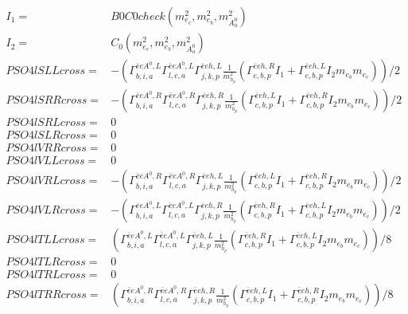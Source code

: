 \documentclass[A4,landscape]{article}
\begin{document}
\begin{align} 
I_1= & B0C0check(m^2_{e_{{c}}}, m^2_{e_{{b}}}, m^2_{A^0_{{a}}}) \\ 
I_2= & C_0(m^2_{e_{{c}}}, m^2_{e_{{b}}}, m^2_{A^0_{{a}}}) \\ 
  PSO4lSLLcross= & -( \Gamma^{\bar{e}e A^0 ,L}_{b, i, a} \Gamma^{\bar{e}e A^0 ,L}_{l, c, a} \Gamma^{\bar{e}e h ,L}_{j, k, p} \frac{1}{m^2_{h_{{p}}}} (\Gamma^{\bar{e}e h ,R}_{c, b, p} I_1 + \Gamma^{\bar{e}e h ,L}_{c, b, p} I_2 m_{e_{{b}}} m_{e_{{c}}}))/2 \\ 
  PSO4lSRRcross= & -( \Gamma^{\bar{e}e A^0 ,R}_{b, i, a} \Gamma^{\bar{e}e A^0 ,R}_{l, c, a} \Gamma^{\bar{e}e h ,R}_{j, k, p} \frac{1}{m^2_{h_{{p}}}} (\Gamma^{\bar{e}e h ,L}_{c, b, p} I_1 + \Gamma^{\bar{e}e h ,R}_{c, b, p} I_2 m_{e_{{b}}} m_{e_{{c}}}))/2 \\ 
  PSO4lSRLcross= & 0 \\ 
  PSO4lSLRcross= & 0 \\ 
  PSO4lVRRcross= & 0 \\ 
  PSO4lVLLcross= & 0 \\ 
  PSO4lVRLcross= & -( \Gamma^{\bar{e}e A^0 ,R}_{b, i, a} \Gamma^{\bar{e}e A^0 ,R}_{l, c, a} \Gamma^{\bar{e}e h ,L}_{j, k, p} \frac{1}{m^2_{h_{{p}}}} (\Gamma^{\bar{e}e h ,L}_{c, b, p} I_1 + \Gamma^{\bar{e}e h ,R}_{c, b, p} I_2 m_{e_{{b}}} m_{e_{{c}}}))/2 \\ 
  PSO4lVLRcross= & -( \Gamma^{\bar{e}e A^0 ,L}_{b, i, a} \Gamma^{\bar{e}e A^0 ,L}_{l, c, a} \Gamma^{\bar{e}e h ,R}_{j, k, p} \frac{1}{m^2_{h_{{p}}}} (\Gamma^{\bar{e}e h ,R}_{c, b, p} I_1 + \Gamma^{\bar{e}e h ,L}_{c, b, p} I_2 m_{e_{{b}}} m_{e_{{c}}}))/2 \\ 
  PSO4lTLLcross= & ( \Gamma^{\bar{e}e A^0 ,L}_{b, i, a} \Gamma^{\bar{e}e A^0 ,L}_{l, c, a} \Gamma^{\bar{e}e h ,L}_{j, k, p} \frac{1}{m^2_{h_{{p}}}} (\Gamma^{\bar{e}e h ,R}_{c, b, p} I_1 + \Gamma^{\bar{e}e h ,L}_{c, b, p} I_2 m_{e_{{b}}} m_{e_{{c}}}))/8 \\ 
  PSO4lTLRcross= & 0 \\ 
  PSO4lTRLcross= & 0 \\ 
  PSO4lTRRcross= & ( \Gamma^{\bar{e}e A^0 ,R}_{b, i, a} \Gamma^{\bar{e}e A^0 ,R}_{l, c, a} \Gamma^{\bar{e}e h ,R}_{j, k, p} \frac{1}{m^2_{h_{{p}}}} (\Gamma^{\bar{e}e h ,L}_{c, b, p} I_1 + \Gamma^{\bar{e}e h ,R}_{c, b, p} I_2 m_{e_{{b}}} m_{e_{{c}}}))/8 \\ 
\end{align} 
\end{document}
